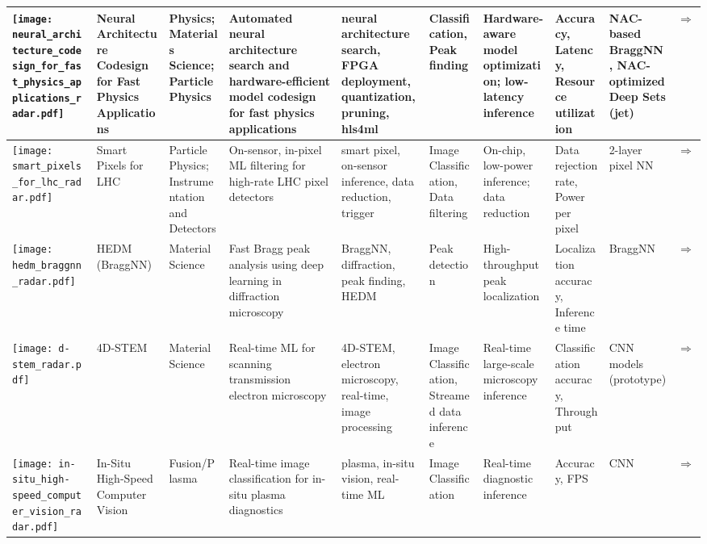 \begin{landscape}
{\begin{longtable}{|p{}|p{}|p{}|p{}|p{}|p{}|p{}|p{}|p{}|p{}|}
\texttt{[image: neural\_architecture\_codesign\_for\_fast\_physics\_applications\_radar.pdf]} & Neural Architecture Codesign for Fast Physics Applications & Physics; Materials Science; Particle Physics & Automated neural architecture search and hardware-efficient model codesign for fast physics applications & neural architecture search, FPGA deployment, quantization, pruning, hls4ml & Classification, Peak finding & Hardware-aware model optimization; low-latency inference & Accuracy, Latency, Resource utilization & NAC-based BraggNN, NAC-optimized Deep Sets (jet) & \cite{weitz2025neuralarchitecturecodesignfast}\href{https://arxiv.org/abs/2501.05515}{$\Rightarrow$} \\ \hline
\texttt{[image: smart\_pixels\_for\_lhc\_radar.pdf]} & Smart Pixels for LHC & Particle Physics; Instrumentation and Detectors & On-sensor, in-pixel ML filtering for high-rate LHC pixel detectors & smart pixel, on-sensor inference, data reduction, trigger & Image Classification, Data filtering & On-chip, low-power inference; data reduction & Data rejection rate, Power per pixel & 2-layer pixel NN & \cite{parpillon2024smartpixelsinpixelai}\href{https://arxiv.org/abs/2406.14860}{$\Rightarrow$} \\ \hline
\texttt{[image: hedm\_braggnn\_radar.pdf]} & HEDM (BraggNN) & Material Science & Fast Bragg peak analysis using deep learning in diffraction microscopy & BraggNN, diffraction, peak finding, HEDM & Peak detection & High-throughput peak localization & Localization accuracy, Inference time & BraggNN & \cite{liu2021braggnnfastxraybragg}\href{https://arxiv.org/abs/2008.08198}{$\Rightarrow$} \\ \hline
\texttt{[image: d-stem\_radar.pdf]} & 4D-STEM & Material Science & Real-time ML for scanning transmission electron microscopy & 4D-STEM, electron microscopy, real-time, image processing & Image Classification, Streamed data inference & Real-time large-scale microscopy inference & Classification accuracy, Throughput & CNN models (prototype) & \cite{qin2023extremely}\href{https://openreview.net/pdf?id=7yt3N0o0W9}{$\Rightarrow$} \\ \hline
\texttt{[image: in-situ\_high-speed\_computer\_vision\_radar.pdf]} & In-Situ High-Speed Computer Vision & Fusion/Plasma & Real-time image classification for in-situ plasma diagnostics & plasma, in-situ vision, real-time ML & Image Classification & Real-time diagnostic inference & Accuracy, FPS & CNN & \cite{wei2024lowlatencyopticalbasedmode}\href{https://arxiv.org/abs/2312.00128}{$\Rightarrow$} \\ \hline

\end{longtable}}
\end{landscape}
